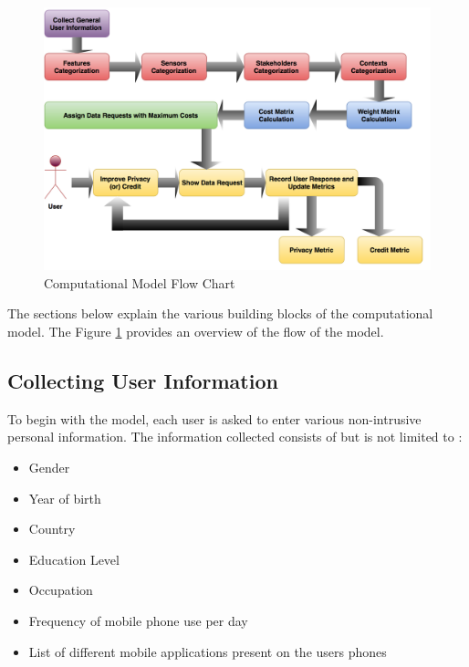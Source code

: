 \begin{figure}[ht!]
\centering
\includegraphics[width=\textwidth,height=\textwidth]{./images/model_building_blocks}
\caption{Computational Model Flow Chart \label{model_blocks}}
\end{figure}

The sections below explain the various building blocks of the computational model. The Figure \ref{model_blocks}
provides an overview of the flow of the model.

\subsection{Collecting User Information}
To begin with the model, each user is asked to enter various non-intrusive personal information. The information collected consists of but is not limited to :

\begin{itemize}
\item Gender
\item Year of birth
\item Country
\item Education Level
\item Occupation
\item Frequency of mobile phone use per day
\item List of different mobile applications present on the users phones
\end{itemize}

